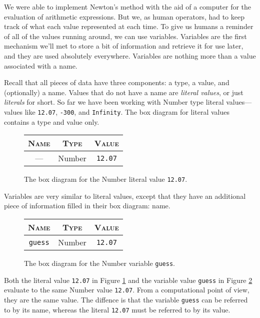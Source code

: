 We were able to implement Newton's method with the aid of a computer for the evaluation of arithmetic expressions. But we, as human operators, had to keep track of what each value represented at each time. To give us humans a reminder of all of the values running around, we can use variables. Variables are the first mechanism we'll met to store a bit of information and retrieve it for use later, and they are used absolutely everywhere. Variables are nothing more than a value associated with a name.

Recall that all pieces of data have three components: a type, a value, and (optionally) a name. Values that do not have a name are \emph{literal values}, or just \emph{literals} for short. So far we have been working with Number type literal values---values like \texttt{12.07}, \texttt{-300}, and \texttt{Infinity}. The box diagram for literal values contains a type and value only.

\begin{figure}[h]
\begin{tabular}{|c|c|c|}
  \hline
  \textsc{Name} & \textsc{Type} & \textsc{Value}\\
  \hline
  --- & \textsf{Number} & \texttt{12.07}\\
  \hline
\end{tabular}
\caption{\label{fig:intro-literal}The box diagram for the Number literal value \texttt{12.07}.}
\end{figure}

Variables are very similar to literal values, except that they have an additional piece of information filled in their box diagram: name.

\begin{figure}[h]
\begin{tabular}{|c|c|c|}
  \hline
  \textsc{Name} & \textsc{Type} & \textsc{Value}\\
  \hline
  \texttt{guess} & \textsf{Number} & \texttt{12.07}\\
  \hline
\end{tabular}
\caption{\label{fig:intro-variable} The box diagram for the Number variable \texttt{guess}.}
\end{figure}

Both the literal value \texttt{12.07} in Figure \ref{fig:intro-literal} and the variable value \texttt{guess} in Figure \ref{fig:intro-variable} evaluate to the same Number value \texttt{12.07}. From a computational point of view, they are the same value. The diffence is that the variable \texttt{guess} can be referred to by its name, whereas the literal \texttt{12.07} must be referred to by its value.

